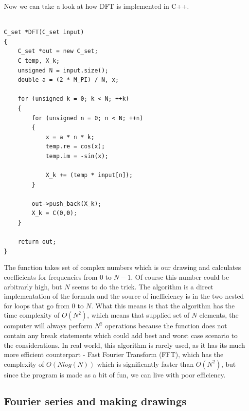 \documentclass{article}
\begin{document}
    Now we can take a look at how DFT is implemented in C++.

    \begin{verbatim}

C_set *DFT(C_set input)
{
    C_set *out = new C_set;
    C temp, X_k;
    unsigned N = input.size();
    double a = (2 * M_PI) / N, x;

    for (unsigned k = 0; k < N; ++k)
    {
        for (unsigned n = 0; n < N; ++n)
        {
            x = a * n * k;
            temp.re = cos(x);
            temp.im = -sin(x);

            X_k += (temp * input[n]);
        }

        out->push_back(X_k);
        X_k = C(0,0);
    }

    return out;
}
    \end{verbatim}

    The function takes set of complex numbers which is our drawing and calculates
    coefficients for frequencies from $0$ to $N-1$. Of course this number could
    be arbitrarly high, but $N$ seems to do the trick. The algorithm is a direct
    implementation of the formula and the source of inefficiency is in the two
    nested for loops that go from $0$ to $N$. What this means is that the algorithm
    has the time complexity of $O(N^2)$, which means that supplied set of $N$ elements,
    the computer will always perform $N^2$ operations because the function does
    not contain any break statements which could add best and worst case scenario
    to the considerations. In real world, this algorithm is rarely used, as it has
    its much more efficient counterpart - 
    Fast Fourier Transform (FFT), which has the 
    complexity of $O(Nlog(N))$ which is significantly faster than $O(N^2)$, but 
    since the program is made as a bit of fun, we can live with poor efficiency.
    


\subsection{Fourier series and making drawings}
\end{document}
